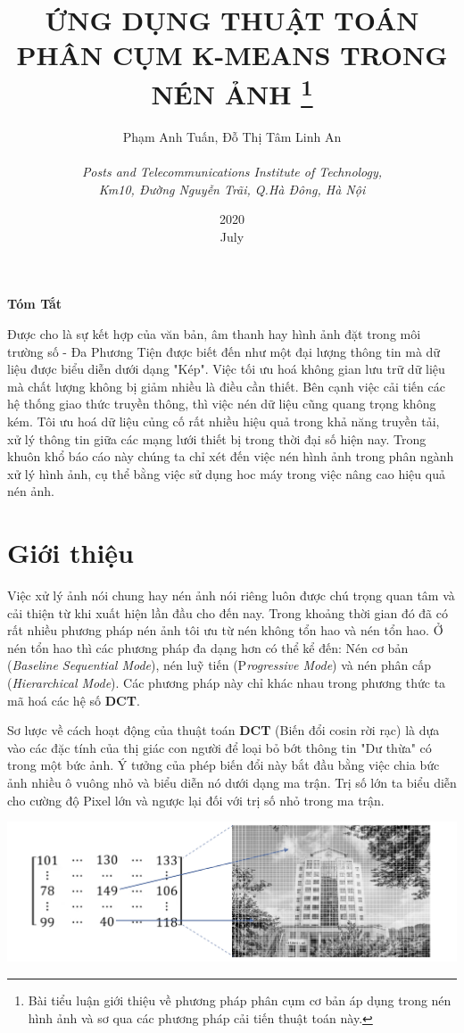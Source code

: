 \documentclass[12pt,a4paper]{article}
\title{\textbf{ ỨNG DỤNG THUẬT TOÁN PHÂN CỤM K-MEANS TRONG NÉN ẢNH   }\thanks{Bài tiểu luận giới thiệu về phương pháp phân cụm cơ bản áp dụng trong nén hình ảnh và sơ qua các phương pháp cải tiến thuật toán này.}}
\date{2020\\ July}
\author{Phạm Anh Tuấn, Đỗ Thị Tâm Linh An \\ \\ \textit{Posts and Telecommunications Institute of Technology,} \\ \textit{Km10, Đường Nguyễn Trãi, Q.Hà Đông, Hà Nội}}
\begin{document}
\maketitle
\begin{center}
	\textbf{\large Tóm Tắt}
\end{center}


Được cho là sự kết hợp của văn bản, âm thanh hay hình ảnh đặt trong môi trường số - Đa Phương Tiện được biết đến như một đại lượng thông tin mà dữ liệu được biểu diễn dưới dạng "Kép". Việc tối ưu hoá không gian lưu trữ dữ liệu mà chất lượng không bị giảm nhiều là điều cần thiết. Bên cạnh việc cải tiến các hệ thống giao thức truyền thông, thì việc nén dữ liệu cũng quang trọng không kém. Tôi ưu hoá dữ liệu củng cố rất nhiều hiệu quả trong khả năng truyền tải, xử lý thông tin giữa các mạng lưới thiết bị trong thời đại số hiện nay. Trong khuôn khổ  báo cáo này chúng ta chỉ xét đến việc nén hình ảnh trong phân ngành xử lý hình ảnh, cụ thể bằng việc sử dụng hoc máy trong việc nâng cao hiệu quả nén ảnh.
\newpage
\section{Giới thiệu }

Việc xử lý ảnh nói chung hay nén ảnh nói riêng luôn được chú trọng quan tâm và cải thiện từ khi xuất hiện lần đầu cho đến nay. Trong khoảng thời gian đó đã có rất nhiều phương pháp nén ảnh tôi ưu từ nén không tổn hao và nén tổn hao. Ở nén tổn hao thì các phương pháp đa dạng hơn có thể kể đến: Nén cơ bản (\textit{Baseline Sequential Mode}), nén luỹ tiến (P\textit{rogressive Mode}) và nén phân cấp (\textit{Hierarchical Mode}). Các phương pháp này chỉ khác nhau trong phương thức ta mã hoá các hệ số \textbf{DCT}.

Sơ lược về cách hoạt động của thuật toán \textbf{DCT} (Biến đổi cosin rời rạc) là dựa vào các đặc tính của thị giác con người để loại bỏ bớt thông tin "Dư thừa" có trong một bức ảnh. Ý tưởng của phép biến đổi này bắt đầu bằng việc chia bức ảnh nhiều ô vuông nhỏ và biểu diễn nó dưới dạng ma trận. Trị số lớn ta biểu diễn cho cường độ Pixel lớn và ngược lại đối với trị số nhỏ trong ma trận.

\begin{center}
\includegraphics[scale=0.45]{Bieudienbinary.png}
\end{center}
\end{document}
